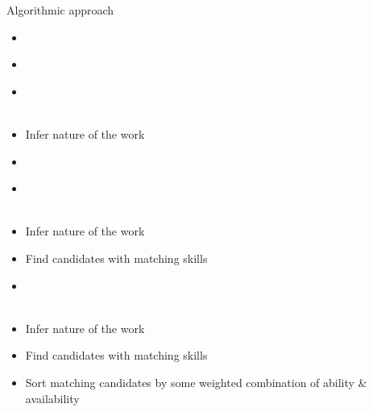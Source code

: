 \documentclass[12pt]{beamer}
\newcommand*\ouritem{%
\item[\color{black}\scalebox{0.9}{\textbullet}]}
\newcommand*\imgitem{%
\item[\color{white}\scalebox{0.9}{\textbullet}]}
\begin{document}
\begin{frame}{}
\begin{center}
Algorithmic approach
\end{center}

\begin{animateinline}[autoplay]{2}
\begin{minipage}{\textwidth}
\Large
\begin{itemize}
\imgitem \textcolor{white}{Infer nature of the work}

\imgitem \textcolor{white}{Find candidates with matching skills}

\imgitem \textcolor{white}{Sort matching candidates by some weighted combination of ability \& availability}
\end{itemize}
\end{minipage}
\newframe
\begin{minipage}{\textwidth}
\Large
\begin{itemize}
\ouritem Infer nature of the work

\imgitem \textcolor{white}{Find candidates with matching skills}

\imgitem \textcolor{white}{Sort matching candidates by some weighted combination of ability \& availability}
\end{itemize}
\end{minipage}
\newframe
\begin{minipage}{\textwidth}
\Large
\begin{itemize}
\ouritem Infer nature of the work

\ouritem Find candidates with matching skills

\imgitem \textcolor{white}{Sort matching candidates by some weighted combination of ability \& availability}
\end{itemize}
\end{minipage}
\newframe
\begin{minipage}{\textwidth}
\Large
\begin{itemize}
\ouritem Infer nature of the work

\ouritem Find candidates with matching skills

\ouritem Sort matching candidates by some weighted combination of ability \& availability
\end{itemize}
\end{minipage}
\end{animateinline}
\end{frame}
\end{document}
